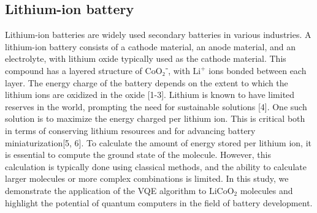 \documentclass[pdflatex,sn-mathphys-num]{sn-jnl}%
\theoremstyle{thmstyleone}%
\theoremstyle{thmstyletwo}%
\theoremstyle{thmstylethree}%
\begin{document}
\subsection{Lithium-ion battery}\label{subsec2.1}
Lithium-ion batteries are widely used secondary batteries in various industries. A lithium-ion battery consists of a cathode material, an anode material, and an electrolyte, with lithium oxide typically used as the cathode material. This compound has a layered structure of CoO₂⁻, with \(\mathrm{Li^+}\) ions bonded between each layer. The energy charge of the battery depends on the extent to which the lithium ions are oxidized in the oxide [1-3].
Lithium is known to have limited reserves in the world, prompting the need for sustainable solutions [4]. One such solution is to maximize the energy charged per lithium ion. 
This is critical both in terms of conserving lithium resources and for advancing battery miniaturization[5, 6]. 
To calculate the amount of energy stored per lithium ion, it is essential to compute the ground state of the molecule. However, this calculation is typically done using classical methods, 
and the ability to calculate larger molecules or more complex combinations is limited.
In this study, we demonstrate the application of the VQE algorithm to \(\mathrm{LiCoO_2}\) molecules and highlight the potential of quantum computers in the field of battery development.
\end{document}
